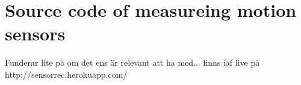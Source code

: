 \chapter{Source code of measureing motion sensors}\label{sensorrec}

Funderar lite på om det ens är relevant att ha med... finns iaf live på\\
http://sensorrec.herokuapp.com/
\\
